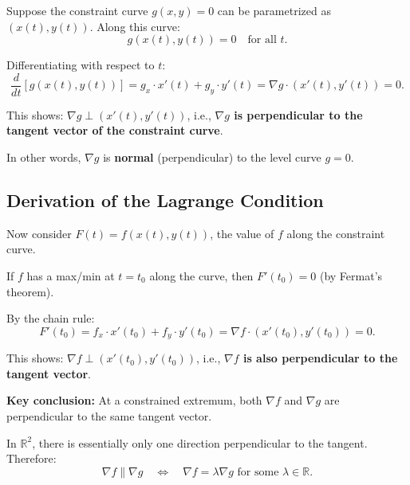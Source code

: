 \documentclass[11pt]{report}
\newcommand{\R}{\mathbb{R}}
\begin{document}
Suppose the constraint curve $g(x, y) = 0$ can be parametrized as $(x(t), y(t))$. Along this curve:
\[
g(x(t), y(t)) = 0 \quad \text{for all } t.
\]

Differentiating with respect to $t$:
\[
\frac{d}{dt}[g(x(t), y(t))] = g_x \cdot x'(t) + g_y \cdot y'(t) = \nabla g \cdot (x'(t), y'(t)) = 0.
\]

This shows: $\nabla g \perp (x'(t), y'(t))$, i.e., \textbf{$\nabla g$ is perpendicular to the tangent vector of the constraint curve}.

In other words, $\nabla g$ is \textbf{normal} (perpendicular) to the level curve $g = 0$.

\subsection{Derivation of the Lagrange Condition}

Now consider $F(t) = f(x(t), y(t))$, the value of $f$ along the constraint curve.

If $f$ has a max/min at $t = t_0$ along the curve, then $F'(t_0) = 0$ (by Fermat's theorem).

By the chain rule:
\[
F'(t_0) = f_x \cdot x'(t_0) + f_y \cdot y'(t_0) = \nabla f \cdot (x'(t_0), y'(t_0)) = 0.
\]

This shows: $\nabla f \perp (x'(t_0), y'(t_0))$, i.e., \textbf{$\nabla f$ is also perpendicular to the tangent vector}.

\textbf{Key conclusion:} At a constrained extremum, both $\nabla f$ and $\nabla g$ are perpendicular to the same tangent vector.

In $\R^2$, there is essentially only one direction perpendicular to the tangent. Therefore:
\[
\boxed{\nabla f \parallel \nabla g \quad \Longleftrightarrow \quad \nabla f = \lambda \nabla g \text{ for some } \lambda \in \R.}
\]
\end{document}
